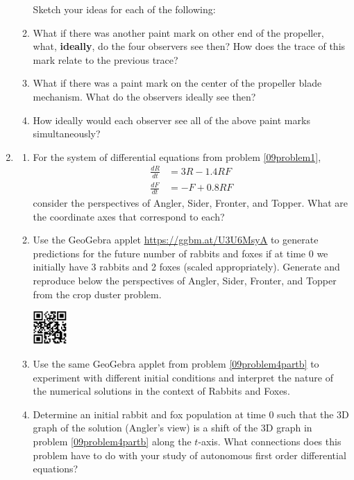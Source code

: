 \begin{enumerate}[resume]
\begin{enumerate}
\vfill
Sketch your ideas for each of the following:
\medskip

\item	What if there was another paint mark on other end of the propeller, what, \textbf{ideally}, do the four observers see then? How does the trace of this mark relate to the previous trace?\label{09problem3partb}\vfill
\item	What if there was a paint mark on the center of the propeller blade mechanism. What do the observers ideally see then?\label{09problem3partc}\vfill
\item	How ideally would each observer see all of the above paint marks simultaneously?\label{09problem3partd}
\vfill
\end{enumerate}

\clearpage

\item	\label{09problem4}
\begin{enumerate}
\item For the system of differential equations from problem \ref{09problem1},   
\begin{align*}
\frac{dR}{dt} &= 3R-1.4RF \\
\frac{dF}{dt} &= -F+0.8RF
\end{align*}
consider the perspectives of Angler, Sider, Fronter, and Topper. What are the coordinate axes that correspond to each? \label{09problem4parta} \vfill
\item Use the GeoGebra applet \href{https://ggbm.at/U3U6MsyA}{\underline{https://ggbm.at/U3U6MsyA}} to generate predictions for the future number of rabbits and foxes if at time 0 we initially have 3 rabbits and 2 foxes (scaled appropriately). Generate and reproduce below the perspectives of Angler, Sider, Fronter, and Topper from the crop duster problem. \label{09problem4partb} \vfill

\vspace{-1.9in}\hspace{-0.75in}\includegraphics[width=0.5in]{09/09DEExplorerQR.png}
\vfill
\item Use the same GeoGebra applet from problem \ref{09problem4partb} to experiment with different initial conditions and interpret the nature of the numerical solutions in the context of Rabbits and Foxes. \label{09problem4partc} \vfill
\item	Determine an initial rabbit and fox population at time 0 such that the 3D graph of the solution (Angler's view) is a shift of the 3D graph in problem \ref{09problem4partb} along the $t$-axis. What connections does this problem have to do with your study of autonomous first order differential equations? \label{09problem4partd} \vfill
\end{enumerate}


\end{enumerate}
